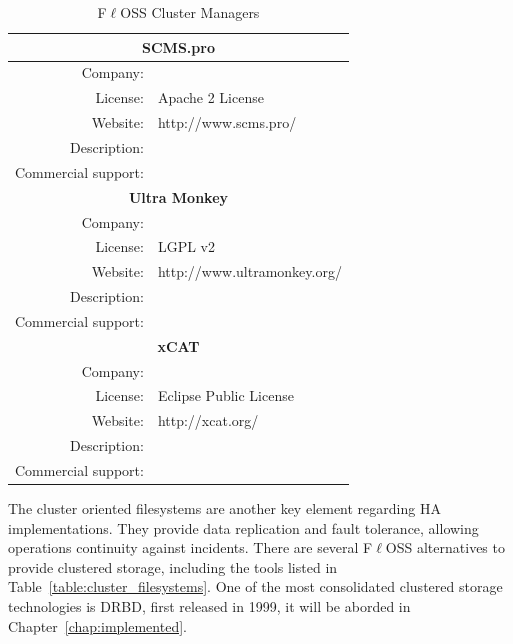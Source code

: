 \documentclass[a4paper, 12pt]{book}
\begin{document}
\hfill\break

\FloatBarrier
\begin{table}[H]
  \centering
  \begin{tabular}{ | r m{10cm} | }
  
    \hline    
    \multicolumn{2}{|c|}{\textbf{SCMS.pro}}\\
    \hline
    Company: &  \\
    License: & Apache 2 License \\
    Website: & http://www.scms.pro/ \\
    Description: &  \\
    Commercial support: &  \\
    
    \hline
    \multicolumn{2}{|c|}{\textbf{Ultra Monkey}}\\
    \hline
    Company: &  \\
    License: & LGPL v2 \\
    Website: & http://www.ultramonkey.org/ \\
    Description: &  \\
    Commercial support: &  \\
    
    \hline    
    \multicolumn{2}{|c|}{\textbf{xCAT}}\\
    \hline
    Company: &  \\
    License: & Eclipse Public License \\
    Website: & http://xcat.org/ \\
    Description: &  \\
    Commercial support: &  \\
    
    \hline
  \end{tabular}
\caption{F$\ell$OSS Cluster Managers}
\label{table:cluster_managers}
\end{table}


\noindent The cluster oriented filesystems are another key element regarding HA implementations. They provide data replication and fault tolerance, allowing operations continuity against incidents. There are several F$\ell$OSS alternatives to provide clustered storage, including the tools listed in Table~\ref{table:cluster_filesystems}. One of the most consolidated clustered storage technologies is DRBD, first released in 1999, it will be aborded in Chapter~\ref{chap:implemented}.
\end{document}
